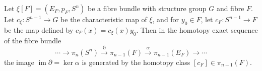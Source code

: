 Let $\xi[F] = (E_F, p_F, S^n)$ be a fibre bundle with structure group $G$ and fibre $F$. Let $c_\xi: S^{n-1} \to G$ be the characteristic map of $\xi$, and for $y_0 \in F$, let $c_F: S^{n-1} \to F$ be the map defined by $c_F(x) = c_\xi(x) y_0$. Then in the homotopy exact sequence of the fibre bundle
$$\cdots \to \pi_n(S^n) \xrightarrow{\partial} \pi_{n-1}(F) \xrightarrow{\alpha} \pi_{n-1}(E_F) \to \cdots$$
the image $\operatorname{im} \partial = \ker \alpha$ is generated by the homotopy class $[c_F] \in \pi_{n-1}(F)$.
